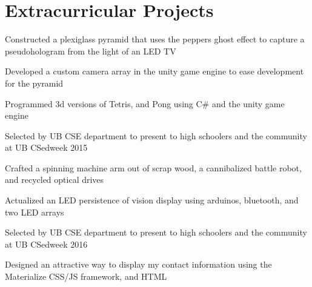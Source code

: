 \documentclass[]{deedy-resume-openfont}
\begin{document}
\begin{minipage}[t]{0.66\textwidth}


\section{Extracurricular Projects}

\vspace{\topsep} %
\begin{tightemize}\item Constructed a plexiglass pyramid that uses the peppers ghost effect to capture a pseudohologram from the light of an LED TV \item Developed a custom camera array in the unity game engine to ease development for the pyramid \item Programmed 3d versions of Tetris, and Pong using C\# and the unity game engine \item Selected by UB CSE department to present to high schoolers and the community at UB CSedweek 2015
\end{tightemize}
\sectionsep

\begin{tightemize}
\item Crafted a spinning machine arm out of scrap wood, a cannibalized battle robot, and recycled optical drives\item Actualized an LED persistence of vision display using arduinos, bluetooth, and two LED arrays\item Selected by UB CSE department to present to high schoolers and the community at UB CSedweek 2016 \end{tightemize}
\sectionsep

\begin{tightemize}
\item Designed an attractive way to display my contact information using the Materialize CSS/JS framework, and HTML\end{tightemize}
\sectionsep


\end{minipage}
\end{document}
